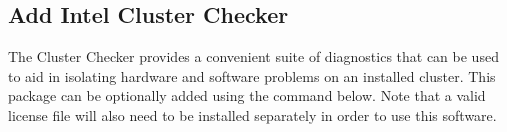 \subsection{Add Intel Cluster Checker} \label{sec:add_clck}

The \Intel{} Cluster Checker provides a convenient suite of diagnostics that
can be used to aid in isolating hardware and software problems on an installed
cluster. This package can be optionally added using the command below. Note
that a valid license file will also need to be installed separately in order to
use this software.
